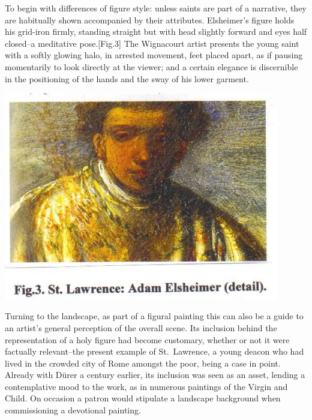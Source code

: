 \documentclass[a4paper,12pt]{article}
\begin{document}
To begin with differences of figure style: unless saints are part of a
narrative, they are habitually shown accompanied by their attributes.
Elsheimer's figure holds his grid-iron firmly, standing straight but
with head slightly forward and eyes half closed--a meditative
pose.[Fig.3] The Wignacourt artist presents the young saint with a
softly glowing halo, in arrested movement, feet placed apart, as if
pausing momentarily to look directly at the viewer; and a certain
elegance is discernible in the positioning of the hands and the sway
of his lower garment.
\begin{center}
\includegraphics[width=12cm]{fig3.jpg}
\end{center}

Turning to the landscape, as part of a figural painting this can also
be a guide to an artist's general perception of the overall scene. Its
inclusion behind the representation of a holy figure had become
customary, whether or not it were factually relevant--the present
example of St.~Lawrence, a young deacon who had lived in the crowded
city of Rome amongst the poor, being a case in point.  Already with
D\"urer a century earlier, its inclusion was seen as an asset, lending a
contemplative mood to the work, as in numerous paintings of the Virgin
and Child.  On occasion a patron would stipulate a landscape
background when commissioning a devotional painting.
\end{document}
